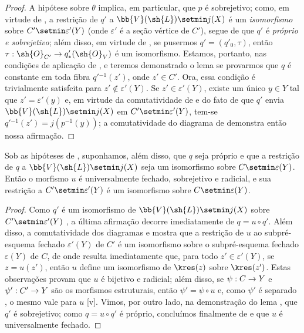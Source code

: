\documentclass[oneside,10pt]{amsart}
\makeatletter
\newcommand{\ega@arrow}[2]{\mathchoice{#1}{#2}{#2}{#2}}
\renewcommand{\to}{\ega@arrow{\longrightarrow}{\rightarrow}}
\newcommand{\oldpage}[2][]{\marginnote{\normalfont\footnotesize\textbf{#1}~|~#2}\ignorespaces}
\let\EGAOriginalLabel\label
\renewcommand{\label}[1]{\phantomsection\EGAOriginalLabel{#1}}
\makeatother
\begin{document}
\begin{proof}
A hipótese sobre $\theta$ implica, em particular, que $p$ é sobrejetivo;
como, em virtude de , a restrição de $q'$ a $\bb{V}(\sh{L})\setmin j(X)$ é um \emph{isomorfismo} sobre $C'\setmin\varepsilon'(Y)$ (onde $\varepsilon'$ é a seção vértice de $C'$), segue de  que $q'$ é \emph{próprio e sobrejetivo};
além disso, em virtude de , se pusermos $q'=(q'_0,\tau)$, então $\tau:\sh{O}_{C'}\to q'_*(\sh{O}_V)$ é um isomorfismo.
Estamos, portanto, nas condições de aplicação de , e teremos demonstrado o lema se provarmos que $q$ é constante em toda fibra $q'{}^{-1}(z')$, onde $z'\in C'$.
Ora, essa condição é trivialmente satisfeita para $z'\notin\varepsilon'(Y)$.
Se $z'\in\varepsilon'(Y)$, existe um único $y\in Y$ tal que $z'=\varepsilon'(y)$ e, em virtude da comutatividade de  e do fato de que $q'$ envia $\bb{V}(\sh{L})\setmin j(X)$ em $C'\setmin\varepsilon'(Y)$, tem-se $q'{}^{-1}(z')=j(p^{-1}(y))$;
a comutatividade do diagrama de  demonstra então nossa afirmação.
\end{proof}

\begin{corollary}[8.11.6]
\label{II.8.11.6}
Sob as hipóteses de , suponhamos, além disso, que $q$ seja próprio e que a restrição de $q$ a $\bb{V}(\sh{L})\setmin j(X)$ seja um isomorfismo sobre $C\setmin\varepsilon(Y)$.
Então o morfismo $u$ é universalmente fechado, sobrejetivo e radicial, e sua restrição a $C'\setmin\varepsilon'(Y)$ é um isomorfismo sobre $C\setmin\varepsilon(Y)$.
\end{corollary}

\begin{proof}
Como $q'$ é um isomorfismo de $\bb{V}(\sh{L})\setmin j(X)$ sobre $C'\setmin\varepsilon'(Y)$ , a última afirmação decorre imediatamente de $q=u\circ q'$.
Além disso, a comutatividade dos diagramas
\oldpage[II]{191}
 e  mostra que a restrição de $u$ ao subpré-esquema fechado $\varepsilon'(Y)$ de $C'$ é um isomorfismo sobre o subpré-esquema fechado $\varepsilon(Y)$ de $C$, de onde resulta imediatamente que, para todo $z'\in\varepsilon'(Y)$, se $z=u(z')$, então $u$ define um isomorfismo de $\kres(z)$ sobre $\kres(z')$.
Estas observações provam que $u$ é bijetivo e radicial;
além disso, se $\psi:C\to Y$ e $\psi':C'\to Y$ são os morfismos estruturais, então $\psi'=\psi\circ u$ e, como $\psi'$ é separado , o mesmo vale para $u$ [v].
Vimos, por outro lado, na demonstração do lema , que $q'$ é sobrejetivo;
como $q=u\circ q'$ é próprio, concluímos finalmente de  e  que $u$ é universalmente fechado.
\end{proof}
\end{document}
